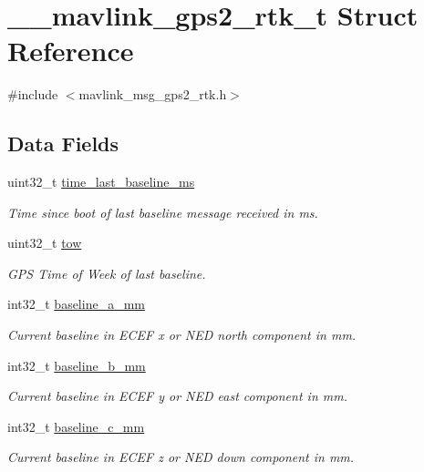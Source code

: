 \hypertarget{struct____mavlink__gps2__rtk__t}{\section{\+\_\+\+\_\+mavlink\+\_\+gps2\+\_\+rtk\+\_\+t Struct Reference}
\label{struct____mavlink__gps2__rtk__t}
}


{\ttfamily \#include $<$mavlink\+\_\+msg\+\_\+gps2\+\_\+rtk.\+h$>$}

\subsection*{Data Fields}
\begin{DoxyCompactItemize}
\item 
uint32\+\_\+t \hyperlink{struct____mavlink__gps2__rtk__t_a5e2d3de022e8a6d3a57aa5f828f3411a}{time\+\_\+last\+\_\+baseline\+\_\+ms}
\begin{DoxyCompactList}\small\item\em Time since boot of last baseline message received in ms. \end{DoxyCompactList}\item 
uint32\+\_\+t \hyperlink{struct____mavlink__gps2__rtk__t_a628d247767b00552231f28dc402b6b22}{tow}
\begin{DoxyCompactList}\small\item\em G\+P\+S Time of Week of last baseline. \end{DoxyCompactList}\item 
int32\+\_\+t \hyperlink{struct____mavlink__gps2__rtk__t_a92813d61c91e581703c6fb44e01b4c73}{baseline\+\_\+a\+\_\+mm}
\begin{DoxyCompactList}\small\item\em Current baseline in E\+C\+E\+F x or N\+E\+D north component in mm. \end{DoxyCompactList}\item 
int32\+\_\+t \hyperlink{struct____mavlink__gps2__rtk__t_acda4ef72fe20e914e4a27e6906c5f826}{baseline\+\_\+b\+\_\+mm}
\begin{DoxyCompactList}\small\item\em Current baseline in E\+C\+E\+F y or N\+E\+D east component in mm. \end{DoxyCompactList}\item 
int32\+\_\+t \hyperlink{struct____mavlink__gps2__rtk__t_a501dacf0b85ade7c8c7d94f0ef3ebf9a}{baseline\+\_\+c\+\_\+mm}
\begin{DoxyCompactList}\small\item\em Current baseline in E\+C\+E\+F z or N\+E\+D down component in mm. \end{DoxyCompactList}\item 

\end{DoxyCompactItemize}
